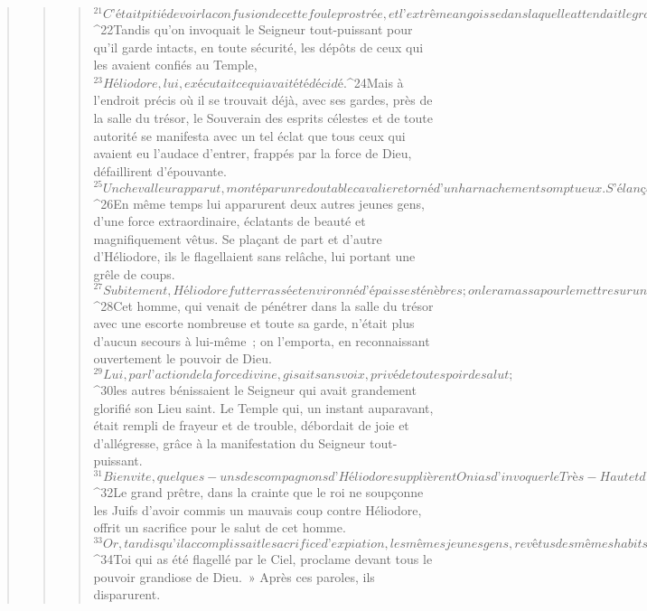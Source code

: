 \begin{verse}
\begin{verse}
\begin{verse}
${}^{21}C’était pitié de voir la confusion de cette foule prostrée, et l’extrême angoisse dans laquelle attendait le grand prêtre. 
${}^{22}Tandis qu’on invoquait le Seigneur tout-puissant pour qu’il garde intacts, en toute sécurité, les dépôts de ceux qui les avaient confiés au Temple, 
${}^{23}Héliodore, lui, exécutait ce qui avait été décidé.
${}^{24}Mais à l’endroit précis où il se trouvait déjà, avec ses gardes, près de la salle du trésor, le Souverain des esprits célestes et de toute autorité se manifesta avec un tel éclat que tous ceux qui avaient eu l’audace d’entrer, frappés par la force de Dieu, défaillirent d’épouvante. 
${}^{25}Un cheval leur apparut, monté par un redoutable cavalier et orné d’un harnachement somptueux. S’élançant avec impétuosité, il projetait les sabots antérieurs vers Héliodore. L’homme qui le chevauchait paraissait avoir une armure d’or. 
${}^{26}En même temps lui apparurent deux autres jeunes gens, d’une force extraordinaire, éclatants de beauté et magnifiquement vêtus. Se plaçant de part et d’autre d’Héliodore, ils le flagellaient sans relâche, lui portant une grêle de coups. 
${}^{27}Subitement, Héliodore fut terrassé et environné d’épaisses ténèbres ; on le ramassa pour le mettre sur une civière. 
${}^{28}Cet homme, qui venait de pénétrer dans la salle du trésor avec une escorte nombreuse et toute sa garde, n’était plus d’aucun secours à lui-même ; on l’emporta, en reconnaissant ouvertement le pouvoir de Dieu. 
${}^{29}Lui, par l’action de la force divine, gisait sans voix, privé de tout espoir de salut ; 
${}^{30}les autres bénissaient le Seigneur qui avait grandement glorifié son Lieu saint. Le Temple qui, un instant auparavant, était rempli de frayeur et de trouble, débordait de joie et d’allégresse, grâce à la manifestation du Seigneur tout-puissant. 
${}^{31}Bien vite, quelques-uns des compagnons d’Héliodore supplièrent Onias d’invoquer le Très-Haut et d’obtenir la grâce de la vie pour cet homme qui gisait là et en était à son tout dernier souffle.
${}^{32}Le grand prêtre, dans la crainte que le roi ne soupçonne les Juifs d’avoir commis un mauvais coup contre Héliodore, offrit un sacrifice pour le salut de cet homme. 
${}^{33}Or, tandis qu’il accomplissait le sacrifice d’expiation, les mêmes jeunes gens, revêtus des mêmes habits, apparurent une seconde fois à Héliodore. Ils se tinrent près de lui et lui dirent : « Rends pleinement grâce à Onias, le grand prêtre, car c’est à cause de lui que le Seigneur t’a accordé la grâce de vivre. 
${}^{34}Toi qui as été flagellé par le Ciel, proclame devant tous le pouvoir grandiose de Dieu. » Après ces paroles, ils disparurent.

\end{verse}
\end{verse}
\end{verse}
